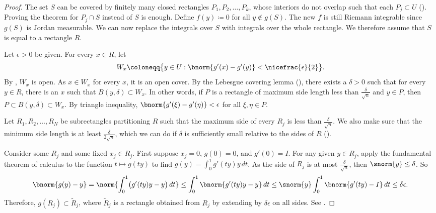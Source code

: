 \begin{proof}
The set $S$ can be covered by finitely many closed rectangles
$P_1,P_2,\ldots,P_k$, whose
interiors do not overlap such that each $P_j \subset U$
().
Proving the theorem for $P_j \cap S$ instead of $S$ is enough.
Define $f(y) \coloneqq 0$ for all $y \notin g(S)$.
The new $f$ is still Riemann integrable since $g(S)$ is Jordan measurable.
We can now replace the integrals over $S$ with integrals over the whole
rectangle.
We therefore assume that $S$ is equal to a rectangle $R$.

Let $\epsilon > 0$ be given.
For every $x \in R$, let
\begin{equation*}
W_x \coloneqq \bigl\{ y \in U : \bnorm{g'(x)-g'(y)} < \nicefrac{\epsilon}{2} \bigr\} .
\end{equation*}
By ,
$W_x$ is open.
As $x \in W_x$ for every $x$, it is an open cover.
By the Lebesgue covering lemma
(),
there exists a $\delta > 0$ such that
for every $y \in R$, there is an $x$ such that $B(y,\delta) \subset W_x$.
In other words, if $P$ is a rectangle of maximum side length less
than $\frac{\delta}{\sqrt{n}}$ and $y \in P$, then $P \subset
B(y,\delta) \subset W_x$.  By triangle inequality,
$\bnorm{g'(\xi)-g'(\eta)} < \epsilon$ for all $\xi, \eta \in P$.

Let $R_1,R_2,\ldots,R_N$ be subrectangles partitioning $R$ such that
the maximum side of every $R_j$ is less than
$\frac{\delta}{\sqrt{n}}$.
We also make sure that the minimum side length is at least
$\frac{\delta}{2\sqrt{n}}$, which we can do if $\delta$ is 
sufficiently small relative to the sides of $R$ ().

Consider some $R_j$ and some fixed $x_j \in R_j$.
First suppose $x_j=0$, $g(0) = 0$, and $g'(0) = I$.
For any given $y \in R_j$,
apply the fundamental theorem of calculus
to the function $t \mapsto g(ty)$ to find
$g(y) = \int_0^1 g'(ty)y \,dt$.  As the
side of $R_j$ is at most $\frac{\delta}{\sqrt{n}}$,
then $\snorm{y} \leq \delta$.  So
\begin{equation*}
\bnorm{g(y)-y}
=
\norm{\int_0^1 \bigl(g'(ty) y - y\bigr) \,dt}
\leq
\int_0^1 \bnorm{g'(ty) y - y} \,dt
\leq
\snorm{y} \int_0^1 \bnorm{g'(ty) - I} \,dt
\leq
\delta \epsilon .
\end{equation*}
Therefore, $g(R_j) \subset \widetilde{R}_j$, where
$\widetilde{R}_j$ is a rectangle obtained from
$R_j$ by extending by
$\delta \epsilon$ on all sides.  See .


\end{proof}
